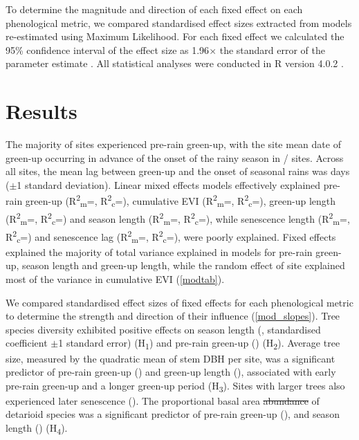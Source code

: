\documentclass[11pt,a4paper]{article}
\providecommand{\DIFdeltex}[1]{{\protect\color{red}\sout{#1}}}                      %
\providecommand{\DIFdelbegin}{} %
\providecommand{\DIFdelend}{} %
\providecommand{\DIFdel}[1]{\texorpdfstring{\DIFdeltex{#1}}{}} %
\newcommand{\DIFscaledelfig}{0.5}
\newlength{\DIFdelgraphicswidth} %
\newlength{\DIFdelgraphicsheight} %
\newcommand{\DIFdelincludegraphics}[2][]{%
\sbox{\DIFdelgraphicsbox}{\DIFOincludegraphics[#1]{#2}}%
\settoboxwidth{\DIFdelgraphicswidth}{\DIFdelgraphicsbox} %
\settoboxtotalheight{\DIFdelgraphicsheight}{\DIFdelgraphicsbox} %
\scalebox{\DIFscaledelfig}{%
\parbox[b]{\DIFdelgraphicswidth}{\usebox{\DIFdelgraphicsbox}\\[-\baselineskip] \rule{\DIFdelgraphicswidth}{0em}}\llap{\resizebox{\DIFdelgraphicswidth}{\DIFdelgraphicsheight}{%
\setlength{\unitlength}{\DIFdelgraphicswidth}%
\begin{picture}(1,1)%
\thicklines\linethickness{2pt} %
{\color[rgb]{1,0,0}\put(0,0){\framebox(1,1){}}}%
{\color[rgb]{1,0,0}\put(0,0){\line( 1,1){1}}}%
{\color[rgb]{1,0,0}\put(0,1){\line(1,-1){1}}}%
\end{picture}%
}\hspace*{3pt}}} %
} %
\DeclareRobustCommand{\DIFdelbegin}{\DIFOdelbegin \let\includegraphics\DIFdelincludegraphics} %
\DeclareRobustCommand{\DIFdelend}{\DIFOaddend \let\includegraphics\DIFOincludegraphics} %
\begin{document}
To determine the magnitude and direction of each fixed effect on each
phenological metric, we compared standardised effect sizes extracted from
models re-estimated using Maximum Likelihood. For each fixed effect we
calculated the 95\% confidence interval of the effect size as 1.96$\times{}$
the standard error of the parameter estimate \citep{Zuur2010}. All statistical
analyses were conducted in R version 4.0.2 \citep{R2020}.

\section{Results}

The majority of sites experienced pre-rain green-up, with the site mean date of
green-up occurring in advance of the onset of the rainy season in
\posGreAll{}/\nSites{} sites. Across all sites, the mean lag between green-up
and the onset of seasonal rains was \greenLagMean{} days ($\pm{}$1 standard
deviation). Linear mixed effects models effectively explained 
pre-rain green-up (R\textsuperscript{2}\textsubscript{m}=\glagRm{},
R\textsuperscript{2}\textsubscript{c}=\glagRc{}), 
cumulative EVI (R\textsuperscript{2}\textsubscript{m}=\cumviRm{},
R\textsuperscript{2}\textsubscript{c}=\cumviRc{}), 
green-up length (R\textsuperscript{2}\textsubscript{m}=\grateRm{},
R\textsuperscript{2}\textsubscript{c}=\grateRc{}) and 
season length (R\textsuperscript{2}\textsubscript{m}=\lengthRm{},
R\textsuperscript{2}\textsubscript{c}=\lengthRc{}), while 
senescence length (R\textsuperscript{2}\textsubscript{m}=\srateRm{},
R\textsuperscript{2}\textsubscript{c}=\srateRc{}) and 
senescence lag (R\textsuperscript{2}\textsubscript{m}=\slagRm{},
R\textsuperscript{2}\textsubscript{c}=\slagRc{}), were poorly explained. Fixed
effects explained the majority of total variance explained in models for
pre-rain green-up, season length and green-up length, while the random effect
of site explained most of the variance in cumulative EVI (\autoref{modtab}).

We compared standardised effect sizes of fixed effects for each phenological
metric to determine the strength and direction of their influence
(\autoref{mod_slopes}). Tree species diversity exhibited positive
effects on season length (\slRich{}, standardised coefficient $\pm$1 standard
error) (H\textsubscript{1}) and pre-rain green-up (\prRich{})
(H\textsubscript{2}). Average tree size, measured by the quadratic mean of stem
DBH per site, was a significant predictor of pre-rain green-up (\prSize{}) and
green-up length (\glSize{}), associated with early pre-rain green-up and a
longer green-up period (H\textsubscript{3}). Sites with larger trees also
experienced later senescence (\slSize{}). The proportional basal area 
\DIFdelbegin \DIFdel{abundance
}\DIFdelend of detarioid species was a significant predictor of pre-rain green-up
(\prDet{}), and season length (\slDet{}) (H\textsubscript{4}). 
\end{document}
